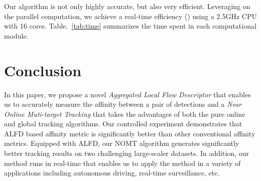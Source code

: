 \documentclass[10pt,twocolumn,letterpaper]{article}
\begin{document}
Our algorithm is not only highly accurate, but also very efficient. Leveraging on the parallel computation, we achieve a real-time efficiency () using a 2.5GHz CPU with 16 cores. Table.~\ref{tab:time} summarizes the time spent in each computational module. 

\section{Conclusion}
\label{sec:conc}
In this paper, we propose a novel \emph{Aggregated Local Flow Descriptor} that enables us to accurately measure the affinity between a pair of detections and a \emph{Near Online Muti-target Tracking} that takes the advantages of both the pure online and global tracking algorithms. Our controlled experiment demonstrates that ALFD based affinity metric is significantly better than other conventional affinity metrics. Equipped with ALFD, our NOMT algorithm generates significantly better tracking results on two challenging large-scaler datasets. In addition, our method runs in real-time that enables us to apply the method in a variety of applications including autonomous driving, real-time surveillance, etc.


{\small


}
\end{document}
